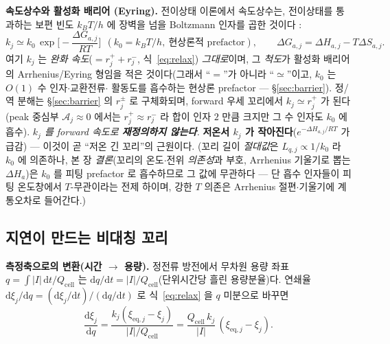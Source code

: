 \documentclass[11pt,a4paper]{article}
\newcommand{\dd}{\mathrm{d}}
\newcommand{\eq}{\mathrm{eq}}
\newcommand{\cell}{\mathrm{cell}}
\begin{document}
\textbf{속도상수와 활성화 배리어 (Eyring).} 전이상태 이론에서 속도상수는, 전이상태를 통과하는 보편 빈도
$k_BT/h$ 에 장벽을 넘을 Boltzmann 인자를 곱한 것이다 \cite{eyring1935}:
\begin{equation}
k_j\simeq k_0\,\exp\!\Big[-\frac{\Delta G_{a,j}}{RT}\Big]\ \ (k_0=k_BT/h,\ \text{현상론적 prefactor}),\qquad \Delta G_{a,j}=\Delta H_{a,j}-T\Delta S_{a,j}.
\label{eq:eyring}
\end{equation}
여기 $k_j$ 는 \emph{완화 속도}($=r_j^++r_j^-$, 식~\eqref{eq:relax}) \emph{그대로}이며, 그 \emph{척도}가 활성화 배리어의
Arrhenius/Eyring 형임을 적은 것이다(그래서 ``$=$''가 아니라 ``$\simeq$''이고, $k_0$ 는 $O(1)$ 수 인자$\cdot$교환전류$\cdot$
활동도를 흡수하는 현상론 prefactor — \S\ref{sec:barrier}). 정/역 분해는 \S\ref{sec:barrier} 의 $r_j^\pm$ 로 구체화되며,
forward 우세 꼬리에서 $k_j\simeq r_j^+$ 가 된다(peak 중심부 $\mathcal A_j\approx0$ 에서는 $r_j^+\approx r_j^-$ 라 합이 인자
$2$ 만큼 크지만 그 수 인자도 $k_0$ 에 흡수). \emph{$k_j$ 를 forward 속도로 \textbf{재정의하지 않는다}.}
\textbf{저온서 $k_j$ 가 작아진다}($e^{-\Delta H_{a,j}/RT}$ 가 급감) — 이것이 곧 ``저온 긴 꼬리''의 근원이다.
(꼬리 길이 \emph{절대값}은 $L_{q,j}\propto1/k_0$ 라 $k_0$ 에 의존하나, 본 장 \emph{결론}(꼬리의 온도$\cdot$전위
\emph{의존성}과 부호, Arrhenius 기울기로 뽑는 $\Delta H_a$)은 $k_0$ 를 피팅 prefactor 로 흡수하므로 그 값에
무관하다 — 단 흡수 인자들이 피팅 온도창에서 $T$-무관이라는 전제 하이며, 강한 $T$ 의존은 Arrhenius
절편$\cdot$기울기에 계통오차로 들어간다.)

\subsection{지연이 만드는 비대칭 꼬리}
\textbf{측정축으로의 변환(시간 $\to$ 용량).} 정전류 방전에서 무차원 용량 좌표 $q=\int|I|\,\dd t/Q_\cell$ 는
$\dd q/\dd t=|I|/Q_\cell$(단위시간당 흘린 용량분율)다. 연쇄율 $\dd\xi_j/\dd q=(\dd\xi_j/\dd t)/(\dd q/\dd t)$ 로
식~\eqref{eq:relax} 을 $q$ 미분으로 바꾸면
\begin{equation}
\frac{\dd\xi_j}{\dd q}=\frac{k_j(\xi_{\eq,j}-\xi_j)}{|I|/Q_\cell}=\frac{Q_\cell\,k_j}{|I|}\,(\xi_{\eq,j}-\xi_j).
\label{eq:dxidq}
\end{equation}
\end{document}
